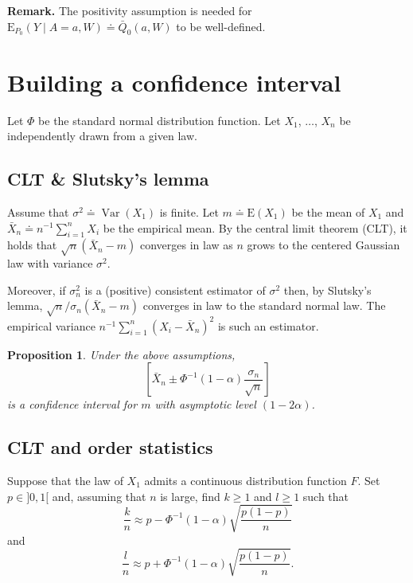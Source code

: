 \documentclass[
  11pt,
  openright,twoside]{book}
\DeclareMathOperator{\Var}{Var}
\newcommand{\defq}{\doteq}
\newcommand{\Exp}{\textrm{E}}
\newcommand{\Qbar}{\bar{Q}}
\newtheorem{proposition}{Proposition}[chapter]
\theoremstyle{definition}
\theoremstyle{definition}
\theoremstyle{definition}
\theoremstyle{definition}
\theoremstyle{remark}
\begin{document}
\textbf{Remark.} The positivity assumption is needed for \(\Exp_{P_0}(Y \mid A = a, W) \defq \Qbar_{0}(a,W)\) to be well-defined.

\hypertarget{confidence-interval}{%
\section{Building a confidence interval}\label{confidence-interval}}

Let \(\Phi\) be the standard normal distribution function. Let \(X_{1}\),
\(\ldots\), \(X_{n}\) be independently drawn from a given law.

\hypertarget{clt}{%
\subsection{CLT \& Slutsky's lemma}\label{clt}}

Assume that \(\sigma^{2} \defq \Var(X_{1})\) is finite. Let \(m \defq \Exp(X_{1})\) be the mean of \(X_{1}\) and \(\bar{X}_{n} \defq n^{-1} \sum_{i=1}^{n} X_{i}\) be the empirical mean. By the central limit theorem
(CLT), it holds that \(\sqrt{n} (\bar{X}_{n} - m)\) converges in law as \(n\)
grows to the centered Gaussian law with variance \(\sigma^{2}\).

Moreover, if \(\sigma_{n}^{2}\) is a (positive) consistent estimator of
\(\sigma^{2}\) then, by Slutsky's lemma, \(\sqrt{n}/\sigma_{n} (\bar{X}_{n} - m)\)
converges in law to the standard normal law. The empirical variance \(n^{-1} \sum_{i=1}^{n}(X_{i} - \bar{X}_{n})^{2}\) is such an estimator.

\begin{proposition}
\protect\hypertarget{prp:unnamed-chunk-4}{}\label{prp:unnamed-chunk-4}Under the above assumptions, \begin{equation*}  \left[\bar{X}_{n}   \pm
\Phi^{-1}(1-\alpha)  \frac{\sigma_{n}}{\sqrt{n}}\right]  \end{equation*} is a
confidence interval for \(m\) with asymptotic level \((1-2\alpha)\).
\end{proposition}

\hypertarget{order}{%
\subsection{CLT and order statistics}\label{order}}

Suppose that the law of \(X_{1}\) admits a continuous distribution function
\(F\). Set \(p \in ]0,1[\) and, assuming that \(n\) is large, find \(k\geq 1\) and \(l \geq 1\) such that \begin{equation*}   \frac{k}{n}   \approx    p   -
\Phi^{-1}(1-\alpha)      \sqrt{\frac{p(1-p)}{n}}      \end{equation*} and
\begin{equation*}    \frac{l}{n}     \approx    p     +    \Phi^{-1}(1-\alpha)
\sqrt{\frac{p(1-p)}{n}}.  \end{equation*}
\end{document}

